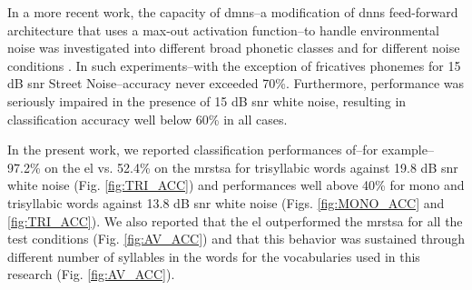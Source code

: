 \documentclass[10pt,letterpaper]{article}
\begin{document}
In a more recent work, the capacity of \glspl{dmn}--a modification of \glspl{dnn} feed-forward architecture that uses a max-out activation function--to handle environmental noise was investigated into different broad phonetic classes and for different noise conditions \cite{silos_2016}.  In such experiments--with the exception of fricatives phonemes for 15 dB \gls{snr} Street Noise--accuracy never exceeded 70\%. Furthermore, performance was seriously impaired in the presence of 15 dB \gls{snr} white noise, resulting in classification accuracy  well below 60\% in all cases.

In the present work, we reported classification performances of--for example--97.2\% on the \gls{el} vs. 52.4\% on the \gls{mrstsa} for trisyllabic words against 19.8 dB \gls{snr} white noise (Fig. \ref{fig:TRI_ACC}) and performances well above 40\% for mono and trisyllabic words against 13.8 dB \gls{snr} white noise (Figs. \ref{fig:MONO_ACC} and \ref{fig:TRI_ACC}). We also reported that the \gls{el} outperformed the \gls{mrstsa} for all the test conditions (Fig. \ref{fig:AV_ACC}) and that this behavior was sustained through different number of syllables in the words for the vocabularies used in this research (Fig. \ref{fig:AV_ACC}).
\end{document}
